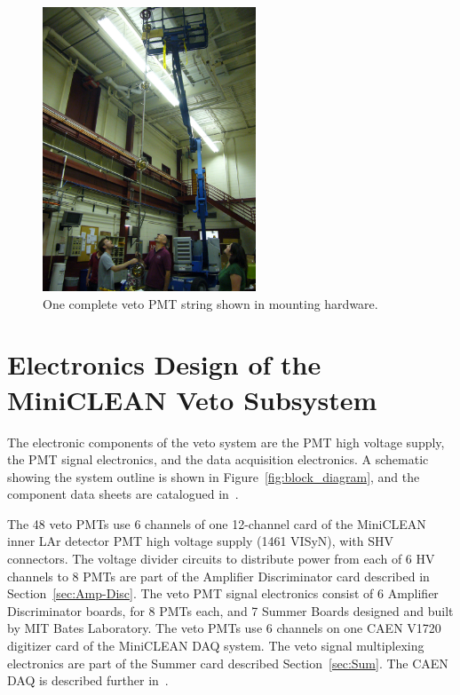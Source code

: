 \documentclass{JINST}
\begin{document}
\begin{figure}[ht]
\begin{center}
\includegraphics[width=2.5in]{graphics/pmtstring.JPG}
\caption{One complete veto PMT string shown in mounting hardware.
\label{fig:vetopmtstringpic}}
\end{center}
\end{figure}


\section{Electronics Design of the MiniCLEAN Veto Subsystem}
\label{sec:electronics_design}
%
The electronic components of the veto system are the PMT high voltage
supply, the PMT signal electronics, and the data acquisition
electronics.  A schematic showing the system outline is shown in
Figure~\ref{fig:block_diagram}, and the component data sheets are catalogued in~\cite{ref:vetocomponentdatasheets}.

The 48 veto PMTs use 6 channels of one 12-channel card of the
MiniCLEAN inner LAr detector PMT high voltage supply (1461 VISyN),
with SHV connectors.  The voltage divider circuits to distribute power
from each of 6 HV channels to 8 PMTs are part of the Amplifier
Discriminator card described in Section~\ref{sec:Amp-Disc}.  The veto
PMT signal electronics consist of 6 Amplifier Discriminator boards,
for 8 PMTs each, and 7 Summer Boards designed and built by MIT Bates
Laboratory.  The veto PMTs use 6 channels on one CAEN V1720 digitizer
card of the MiniCLEAN DAQ system.  The veto signal multiplexing
electronics are part of the Summer card described
Section~\ref{sec:Sum}.  The CAEN DAQ is described further
in~\cite{ref:gastler_thesis}.
\end{document}
